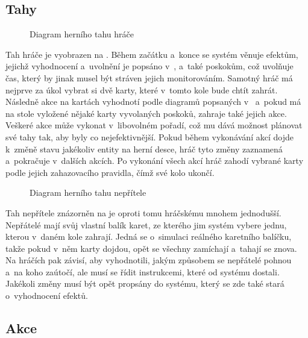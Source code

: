 \subsection{Tahy}
\label{subsec:design_turns}

\begin{figure}[h]
    \centering
    \caption{Diagram herního tahu hráče}
    \label{diag:player_turn}
\end{figure}

Tah hráče je vyobrazen na . Během začátku a~konce se systém věnuje efektům, jejichž vyhodnocení a~uvolnění je popsáno v~, a~také poskokům, což uvolňuje čas, který by jinak musel být stráven jejich monitorováním. Samotný hráč má nejprve za úkol vybrat si dvě karty, které v~tomto kole bude chtít zahrát. Následně akce na kartách vyhodnotí podle diagramů popsaných v~ a~pokud má na stole vyložené nějaké karty vyvolaných poskoků, zahraje také jejich akce. Veškeré akce může vykonat v~libovolném pořadí, což mu dává možnost plánovat své tahy tak, aby byly co nejefektivnější. Pokud během vykonávání akcí dojde k~změně stavu jakékoliv entity na herní desce, hráč tyto změny zaznamená a~pokračuje v~dalších akcích. Po vykonání všech akcí hráč zahodí vybrané karty podle jejich zahazovacího pravidla, čímž své kolo ukončí.

\begin{figure}[h]
    \centering
    \caption{Diagram herního tahu nepřítele}
    \label{diag:enemy_turn}
\end{figure}

Tah nepřítele znázorněn na  je oproti tomu hráčskému mnohem jednodušší. Nepřátelé mají svůj vlastní balík karet, ze kterého jim systém vybere jednu, kterou v~daném kole zahrají. Jedná se o~simulaci reálného karetního balíčku, takže pokud v~něm karty dojdou, opět se všechny zamíchají a~tahají se znova. Na hráčích pak závisí, aby vyhodnotili, jakým způsobem se nepřátelé pohnou a~na koho zaútočí, ale musí se řídit instrukcemi, které od systému dostali. Jakékoli změny musí být opět propsány do systému, který se zde také stará o~vyhodnocení efektů.


\subsection{Akce}
\label{subsec:design_actions}

